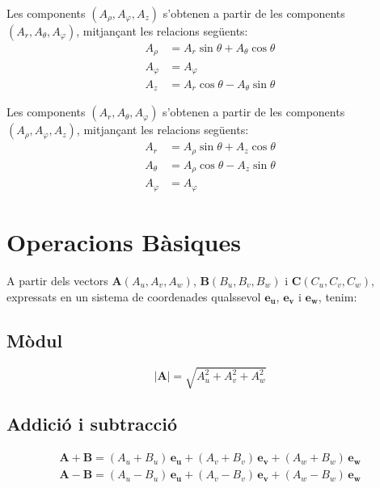 \documentclass[catalan,a4paper,twoside,11pt]{article}
\begin{document}
Les components   $(A_\rho, A_\varphi, A_z)$  s'obtenen a partir de les  components  $(A_r, A_\theta, A_\varphi)$, mitjançant les relacions següents:
\begin{subequations}\begin{align}
    A_\rho &= A_r\sin\theta+A_\theta\cos\theta \\
    A_\varphi &= A_\varphi  \\
    A_z &= A_r\cos\theta-A_\theta\sin\theta  
\end{align}\end{subequations}

Les components $(A_r, A_\theta, A_\varphi)$  s'obtenen a partir de les  components  $(A_\rho, A_\varphi, A_z)$, mitjançant les relacions següents:
\begin{subequations}\begin{align}
    A_r &=  A_\rho\sin\theta+A_z\cos\theta \\
    A_\theta &=  A_\rho\cos\theta-A_z\sin\theta \\
    A_\varphi &= A_\varphi 
\end{align}\end{subequations}


\section{Operacions  Bàsiques}
\newcommand{\va}{\ensuremath{\,\boldsymbol{e_u}}}
\newcommand{\vb}{\ensuremath{\,\boldsymbol{e_v}}}
\newcommand{\vc}{\ensuremath{\,\boldsymbol{e_w}}}

A partir dels vectors $\boldsymbol{A}(A_u,A_v,A_w)$,  $\boldsymbol{B}(B_u,B_v,B_w)$ i $\boldsymbol{C}(C_u,C_v,C_w)$, expressats en un sistema de coordenades qualssevol $\boldsymbol{e_u}$, $\boldsymbol{e_v}$ i $\boldsymbol{e_w}$, tenim:

\subsection{Mòdul}

\begin{equation}
    |\boldsymbol{A}|=  \sqrt{A_u^2 + A_v^2 + A_w^2}
\end{equation}

\subsection{Addició i subtracció}

\begin{subequations}\begin{align}
    \boldsymbol{A+B}= (A_u+B_u)\va + (A_v+B_v)\vb + (A_w+B_w)\vc \\
    \boldsymbol{A-B}= (A_u-B_u)\va + (A_v-B_v)\vb + (A_w-B_w)\vc
\end{align}\end{subequations}
\end{document}
